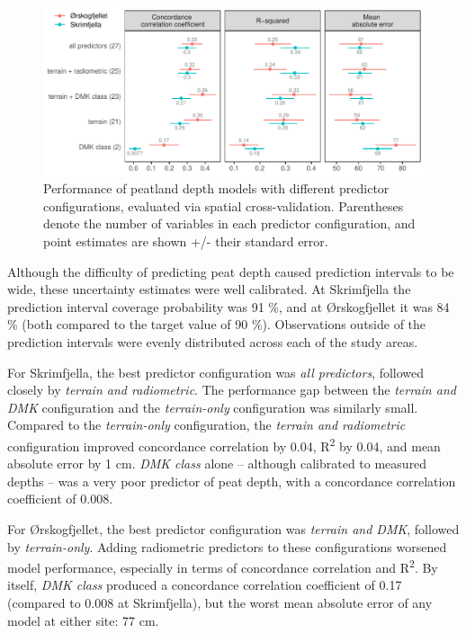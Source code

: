 \documentclass[soil, manuscript]{copernicus}
\begin{document}
\begin{figure}
\centering
\includegraphics{figures/modelmetrics.pdf}
\caption{\label{fig:modelMetrics}Performance of peatland depth models with different predictor configurations, evaluated via spatial cross-validation. Parentheses denote the number of variables in each predictor configuration, and point estimates are shown +/- their standard error.}
\end{figure}

Although the difficulty of predicting peat depth caused prediction intervals to be wide, these uncertainty estimates were well calibrated.
At Skrimfjella the prediction interval coverage probability was 91 \%, and at Ørskogfjellet it was 84 \% (both compared to the target value of 90 \%).
Observations outside of the prediction intervals were evenly distributed across each of the study areas.

For Skrimfjella, the best predictor configuration was \emph{all predictors}, followed closely by \emph{terrain and radiometric}.
The performance gap between the \emph{terrain and DMK} configuration and the \emph{terrain-only} configuration was similarly small.
Compared to the \emph{terrain-only} configuration, the \emph{terrain and radiometric} configuration improved concordance correlation by 0.04, R\textsuperscript{2} by 0.04, and mean absolute error by 1 cm.
\emph{DMK class} alone -- although calibrated to measured depths -- was a very poor predictor of peat depth, with a concordance correlation coefficient of 0.008.

For Ørskogfjellet, the best predictor configuration was \emph{terrain and DMK}, followed by \emph{terrain-only}.
Adding radiometric predictors to these configurations worsened model performance, especially in terms of concordance correlation and R\textsuperscript{2}.
By itself, \emph{DMK class} produced a concordance correlation coefficient of 0.17 (compared to 0.008 at Skrimfjella), but the worst mean absolute error of any model at either site: 77 cm.
\end{document}
